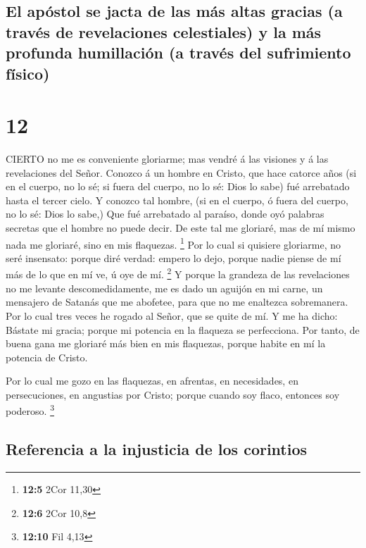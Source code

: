 \hypertarget{el-apuxf3stol-se-jacta-de-las-muxe1s-altas-gracias-a-travuxe9s-de-revelaciones-celestiales-y-la-muxe1s-profunda-humillaciuxf3n-a-travuxe9s-del-sufrimiento-fuxedsico}{%
\subsection{El apóstol se jacta de las más altas gracias (a través de
revelaciones celestiales) y la más profunda humillación (a través del
sufrimiento
físico)}\label{el-apuxf3stol-se-jacta-de-las-muxe1s-altas-gracias-a-travuxe9s-de-revelaciones-celestiales-y-la-muxe1s-profunda-humillaciuxf3n-a-travuxe9s-del-sufrimiento-fuxedsico}}

\hypertarget{section-11}{%
\section{12}\label{section-11}}

 CIERTO no me es conveniente gloriarme; mas vendré á las
visiones y á las revelaciones del Señor.  Conozco á un
hombre en Cristo, que hace catorce años (si en el cuerpo, no lo sé; si
fuera del cuerpo, no lo sé: Dios lo sabe) fué arrebatado hasta el tercer
cielo.  Y conozco tal hombre, (si en el cuerpo, ó fuera del
cuerpo, no lo sé: Dios lo sabe,)  Que fué arrebatado al
paraíso, donde oyó palabras secretas que el hombre no puede decir.
 De este tal me gloriaré, mas de mí mismo nada me gloriaré,
sino en mis flaquezas. \footnote{\textbf{12:5} 2Cor 11,30} 
Por lo cual si quisiere gloriarme, no seré insensato: porque diré
verdad: empero lo dejo, porque nadie piense de mí más de lo que en mí
ve, ú oye de mí. \footnote{\textbf{12:6} 2Cor 10,8}  Y
porque la grandeza de las revelaciones no me levante descomedidamente,
me es dado un aguijón en mi carne, un mensajero de Satanás que me
abofetee, para que no me enaltezca sobremanera.  Por lo cual
tres veces he rogado al Señor, que se quite de mí.  Y me ha
dicho: Bástate mi gracia; porque mi potencia en la flaqueza se
perfecciona. Por tanto, de buena gana me gloriaré más bien en mis
flaquezas, porque habite en mí la potencia de Cristo.

 Por lo cual me gozo en las flaquezas, en afrentas, en
necesidades, en persecuciones, en angustias por Cristo; porque cuando
soy flaco, entonces soy poderoso. \footnote{\textbf{12:10} Fil 4,13}

\hypertarget{referencia-a-la-injusticia-de-los-corintios}{%
\subsection{Referencia a la injusticia de los
corintios}\label{referencia-a-la-injusticia-de-los-corintios}}

